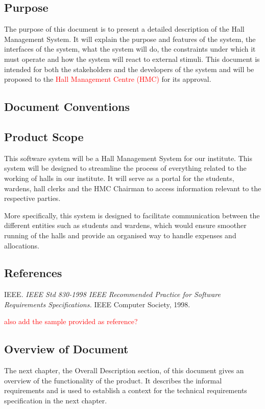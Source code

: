 \documentclass[letterpaper,12pt]{article}
\begin{document}
\subsection{\Large Purpose}
    The purpose of this document is to present a detailed description of the Hall Management System. It will explain the purpose and features of the system, the interfaces
of the system, what the system will do, the constraints under which it must operate and
how the system will react to external stimuli. This document is intended for both the
stakeholders and the developers of the system and will be proposed to the \textcolor{red}{Hall Management Centre (HMC)} for its approval.
\subsection{\Large Document Conventions}
\subsection{\Large Product Scope}
This software system will be a Hall Management System for our institute. This system will be designed to streamline the process of everything related to the working of halls in our institute. It will serve as a portal for the students, wardens, hall clerks and the HMC Chairman to access information relevant to the respective parties.

More specifically, this system is designed to facilitate communication between the different entities such as students and wardens, which would ensure smoother running of the halls and provide an organised way to handle expenses and allocations.

\subsection{\Large References}
IEEE. \emph{IEEE Std 830-1998 IEEE Recommended Practice for Software Requirements
Specifications.} IEEE Computer Society, 1998.

\textcolor{red}{also add the sample provided as reference?}
\subsection{\Large Overview of Document}
The next chapter, the Overall Description section, of this document gives an
overview of the functionality of the product. It describes the informal requirements and is
used to establish a context for the technical requirements specification in the next chapter.
\end{document}

